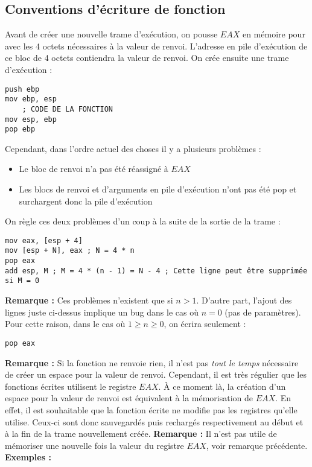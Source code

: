 \documentclass{book}
\newcommand*{\jumpline}{\newline \newline}
\begin{document}
\subsection{Conventions d'écriture de fonction}
Avant de créer une nouvelle trame d'exécution, on pousse $EAX$ en mémoire pour avec les 4 octets nécessaires à la valeur de renvoi. L'adresse en pile d'exécution de ce bloc de 4 octets contiendra la valeur de renvoi.
\jumpline
On crée ensuite une trame d'exécution :
\begin{verbatim}
push ebp
mov ebp, esp
	; CODE DE LA FONCTION
mov esp, ebp
pop ebp
\end{verbatim}
Cependant, dans l'ordre actuel des choses il y a plusieurs problèmes :
\begin{itemize}
	\item Le bloc de renvoi n'a pas été réassigné à $EAX$
	\item Les blocs de renvoi et d'arguments en pile d'exécution n'ont pas été pop et surchargent donc la pile d'exécution
\end{itemize}
On règle ces deux problèmes d'un coup à la suite de la sortie de la trame :
\begin{verbatim}
mov eax, [esp + 4]
mov [esp + N], eax ; N = 4 * n
pop eax
add esp, M ; M = 4 * (n - 1) = N - 4 ; Cette ligne peut être supprimée si M = 0
\end{verbatim}
\textbf{Remarque : } Ces problèmes n'existent que si $n > 1$. D'autre part, l'ajout des lignes juste ci-dessus implique un bug dans le cas où $n = 0$ (pas de paramètres). Pour cette raison, dans le cas où $1\geq{n}\geq{0}$, on écrira seulement :
\begin{verbatim}
pop eax
\end{verbatim}
\textbf{Remarque :} Si la fonction ne renvoie rien, il n'est pas \textit{tout le temps} nécessaire de créer un espace pour la valeur de renvoi. Cependant, il est très régulier que les fonctions écrites utilisent le registre $EAX$. À ce moment là, la création d'un espace pour la valeur de renvoi est équivalent à la mémorisation de $EAX$.
\jumpline
En effet, il est souhaitable que la fonction écrite ne modifie pas les registres qu'elle utilise. Ceux-ci sont donc sauvegardés puis rechargés respectivement au début et à la fin de la trame nouvellement créée.
\jumpline
\textbf{Remarque : } Il n'est pas utile de mémoriser une nouvelle fois la valeur du registre $EAX$, voir remarque précédente.
\jumpline
\textbf{Exemples : }
\end{document}

